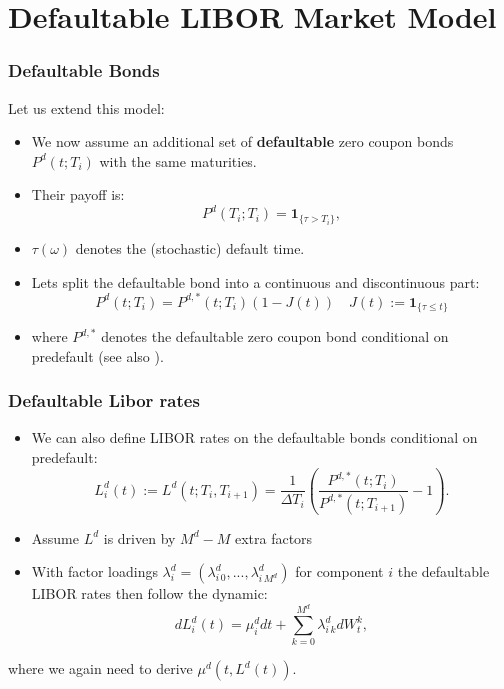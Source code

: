 \documentclass{beamer}
\begin{document}
	\section{Defaultable LIBOR Market Model}\label{sectDLMM}
	
	\begin{frame}
		\frametitle{}
		\tableofcontents[ 
		currentsection, 
		sectionstyle=show/shaded, 
		subsectionstyle=show/shaded, 
		] 
	\end{frame}

	\begin{frame}
		\frametitle{Defaultable Bonds}
		Let us extend this model:
		\begin{itemize}
			\item We now assume an additional set of \textbf{defaultable} zero coupon bonds $P^d(t;T_i)$ with the same maturities.
			\item Their payoff is:
			\[P^d(T_i;T_i) = \mathbf{1}_{\{\tau > T_i\}},\]
			\item $\tau(\omega)$ denotes the (stochastic) default time. 
			\item Lets split the defaultable bond into a continuous and discontinuous part:
			\[P^d(t;T_i) = P^{d,*}(t;T_i)(1 - J(t))\quad J(t):= \mathbf{1}_{\{\tau \le t\}}\]
			\item where $P^{d,*}$ denotes the defaultable zero coupon bond conditional on predefault (see also \cite{friesDLMM}).
		\end{itemize}
	\end{frame}
	
	\begin{frame}
		\frametitle{Defaultable Libor rates}
		\begin{itemize}
			\item We can also define LIBOR rates on the defaultable bonds conditional on predefault:
		\[L^{d}_i(t) := L^{d}(t; T_i, T_{i+1}) = \frac{1}{ \Delta T_i}\left( \frac{P^{d,*}(t; T_i)}{P^{d,*}(t; T_{i+1})} - 1\right) .\]
		\item Assume $L^d$ is driven by $M^d - M$ extra factors
		\item With factor loadings \(\lambda^d_i = (\lambda^d_{i \, 0}, ..., \lambda^d_{i \, M^d})\) for component \(i\) the defaultable LIBOR rates then follow the dynamic:
		\[dL^d_i(t) = \mu_i^ddt + \sum_{k=0}^{M^d}\lambda^d_{i \, k} dW^k_t,\]
		
	\end{itemize}
	where we again need to derive \(\mu^d(t, L^d(t))\).
	\end{frame}
	
\end{document}
